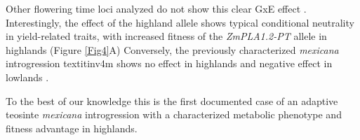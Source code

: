 \documentclass[9pt,twocolumn,twoside,lineno]{BioRxiv}
\begin{document}
Other flowering time loci analyzed do not show this clear GxE effect \cite{Gates2019-xu}.
Interestingly, the effect of the highland allele shows typical conditional neutrality in yield-related traits, with increased fitness of the \textit{ZmPLA1.2-PT} allele in highlands (Figure \ref{Fig4}A)
Conversely, the previously characterized \textit{mexicana} introgression textit{inv4m} \cite{Gonzalez-Segovia2019-jy, pyhajarvi2013, Hufford2013-gs} shows no effect in highlands and negative effect in lowlands \cite{Crow2020-gen}.

To the best of our knowledge this is the first documented case of an adaptive teosinte \textit{mexicana} introgression with a characterized metabolic phenotype and fitness advantage in highlands.



\end{document}
